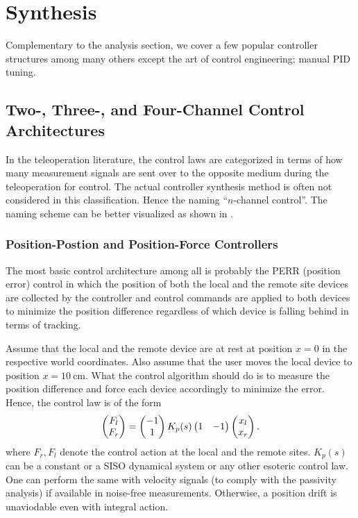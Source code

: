  




\section{Synthesis}

Complementary to the analysis section, we cover a few popular controller structures among many others except the 
art of control engineering; manual PID tuning. 

\subsection{Two-, Three-, and Four-Channel Control Architectures}
In the teleoperation literature, the control laws are categorized in terms of how many measurement signals 
are sent over to the opposite medium during the teleoperation for control. The actual controller synthesis 
method is often not considered in this classification.  Hence the naming \enquote{$n$-channel control}. The
naming scheme can be better visualized as shown in . 


\subsubsection{Position-Postion and Position-Force Controllers}
The most basic control architecture among all is probably the PERR (position error) control in which the 
position of both the local and the remote site devices are collected by the controller and control commands
are applied to both devices to minimize the position difference regardless of which device is falling behind
in terms of tracking.

Assume that the local and the remote device are at rest at position $x=0$ in the respective world coordinates. 
Also assume that the user moves the local device to position $x=\SI{10}{\centi\metre}$. What the control algorithm
should do is to measure the position difference and force each device accordingly to minimize the error. Hence, the
control law is of the form
\[
\begin{pmatrix}F_l\\F_r\end{pmatrix} = \begin{pmatrix}-1\\1\end{pmatrix}K_p(s)\begin{pmatrix}1 &-1\end{pmatrix}\begin{pmatrix}x_l\\x_r\end{pmatrix}.
\]
where $F_r,F_l$ denote the control action at the local and the remote sites. $K_p(s)$ can be a constant or a SISO dynamical 
system or any other esoteric control law. One can perform the same with velocity signals (to comply with the passivity 
analysis) if available in noise-free measurements. Otherwise, a position drift is unaviodable even with integral action. 

